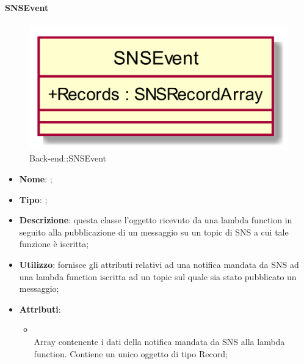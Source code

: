 \hypertarget{SNSEvent_label}{\paragraph{SNSEvent}}
\begin{figure}[h]
	\centering
	\includegraphics[width=\textwidth,height=\textheight,keepaspectratio]{images/ClassSNSEvent.png}
	\caption{Back-end::SNSEvent}
\end{figure}
\begin{itemize}
	\item \textbf{Nome}: ;
	\item \textbf{Tipo}: ;
	\item \textbf{Descrizione}: questa classe l'oggetto ricevuto da una lambda function in seguito alla pubblicazione di un messaggio su un topic di SNS a cui tale funzione è iscritta;
	\item \textbf{Utilizzo}: fornisce gli attributi relativi ad una notifica mandata da SNS ad una lambda function iscritta ad un topic sul quale sia stato pubblicato un messaggio;
	\item \textbf{Attributi}:
	\begin{itemize}
		\item[]  \\
		Array contenente i dati della notifica mandata da SNS alla lambda function. Contiene un unico oggetto di tipo Record;
	\end{itemize}
\end{itemize}

